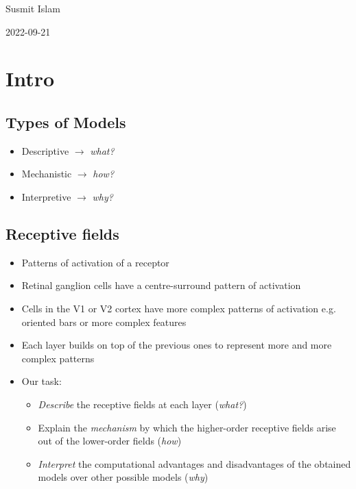 \documentclass[
  12pt,
]{memoir}
\providecommand{\tightlist}{%
  \setlength{\itemsep}{0pt}\setlength{\parskip}{0pt}}
\begin{document}
\hfill Susmit Islam

\hfill 2022-09-21

\hypertarget{intro}{%
\chapter{Intro}\label{intro}}

\hypertarget{types-of-models}{%
\section{Types of Models}\label{types-of-models}}

\begin{itemize}
\tightlist
\item
  Descriptive \(\rightarrow\) \emph{what?}
\item
  Mechanistic \(\rightarrow\) \emph{how?}
\item
  Interpretive \(\rightarrow\) \emph{why?}
\end{itemize}

\hypertarget{receptive-fields}{%
\section{Receptive fields}\label{receptive-fields}}

\begin{itemize}
\tightlist
\item
  Patterns of activation of a receptor
\item
  Retinal ganglion cells have a centre-surround pattern of activation
\item
  Cells in the V1 or V2 cortex have more complex patterns of activation
  e.g. oriented bars or more complex features
\item
  Each layer builds on top of the previous ones to represent more and
  more complex patterns
\item
  Our task:

  \begin{itemize}
  \tightlist
  \item
    \emph{Describe} the receptive fields at each layer (\emph{what?})
  \item
    Explain the \emph{mechanism} by which the higher-order receptive
    fields arise out of the lower-order fields (\emph{how})
  \item
    \emph{Interpret} the computational advantages and disadvantages of
    the obtained models over other possible models (\emph{why})
  \end{itemize}
\end{itemize}

\backmatter
\end{document}
